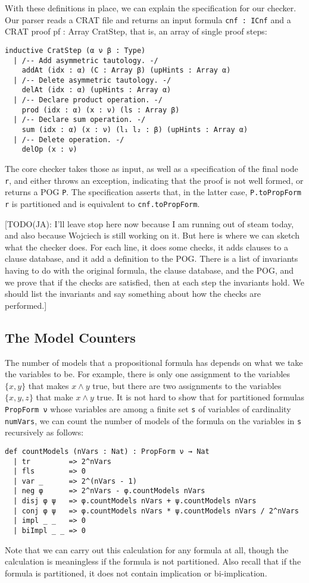With these definitions in place, we can explain the specification for our checker.
Our parser reads a CRAT file and returns an input formula \lstinline{cnf : ICnf} and a CRAT proof {pf : Array CratStep}, that is, an array of single proof steps:
\begin{lstlisting}
inductive CratStep (α ν β : Type)
  | /-- Add asymmetric tautology. -/
    addAt (idx : α) (C : Array β) (upHints : Array α)
  | /-- Delete asymmetric tautology. -/
    delAt (idx : α) (upHints : Array α)
  | /-- Declare product operation. -/
    prod (idx : α) (x : ν) (ls : Array β)
  | /-- Declare sum operation. -/
    sum (idx : α) (x : ν) (l₁ l₂ : β) (upHints : Array α)
  | /-- Delete operation. -/
    delOp (x : ν)
\end{lstlisting}
The core checker takes those as input, as well as a specification of the final node \lstinline{r}, and either throws an exception, indicating that the proof is not well formed, or returns a POG \lstinline{P}.
The specification asserts that, in the latter case, \lstinline{P.toPropForm r} is partitioned
and is equivalent to \lstinline{cnf.toPropForm}.

[TODO(JA): I'll leave stop here now because I am running out of steam today,
and also because Wojciech is still working on it.
But here is where we can sketch what the checker does.
For each line, it does some checks, it adds clauses to a clause database,
and it add a definition to the POG.
There is a list of invariants having to do with the original formula,
the clause database, and the POG, and we prove that if the checks are satisfied,
then at each step the invariants hold.
We should list the invariants and say something about how the checks are
performed.]

\subsection{The Model Counters}

The number of models that a propositional formula has depends on what we take the
variables to be. For example, there is only one assignment to the variables
$\{ x, y \}$ that makes $x \wedge y$ true, but there are two assignments to the
variables $\{ x, y, z \}$ that make $x \wedge y$ true.
It is not hard to show that for partitioned formulas \lstinline{PropForm ν} whose
variables are among a finite set \lstinline{s} of variables of cardinality \lstinline{numVars},
we can count the number of models of the formula on the variables in \lstinline{s}
recursively as follows:
\begin{lstlisting}
def countModels (nVars : Nat) : PropForm ν → Nat
  | tr         => 2^nVars
  | fls        => 0
  | var _      => 2^(nVars - 1)
  | neg φ      => 2^nVars - φ.countModels nVars
  | disj φ ψ   => φ.countModels nVars + ψ.countModels nVars
  | conj φ ψ   => φ.countModels nVars * ψ.countModels nVars / 2^nVars
  | impl _ _   => 0
  | biImpl _ _ => 0
\end{lstlisting}
Note that we can carry out this calculation for any formula at all, though the
calculation is meaningless if the formula is not partitioned.
Also recall that if the formula is partitioned, it does not contain implication or bi-implication.

